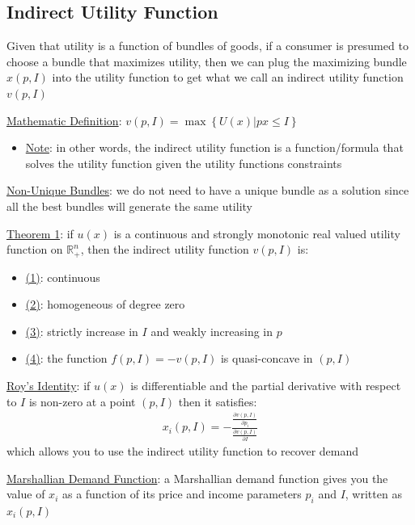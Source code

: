\documentclass{article}
\begin{document}
\subsection{Indirect Utility Function}
Given that utility is a function of bundles of goods, if a consumer is presumed to choose a bundle that maximizes utility, then we can plug the maximizing bundle $x(p,I)$ into the utility function to get what we call an indirect utility function $v(p,I)$ \par \vspace{0.3em}
  \underline{Mathematic Definition}: $v(p,I) = \max \left\{U(x) | px \leq I \right\}$
  \begin{itemize}
    \item  \underline{Note}: in other words, the indirect utility function is a function/formula that solves the utility function given the utility functions constraints
  \end{itemize}
  \par
  \underline{Non-Unique Bundles}: we do not need to have a unique bundle as a solution since all the best bundles will generate the same utility
  \par
  \underline{Theorem 1}: if $u(x)$ is a continuous and strongly monotonic real valued utility function on $\mathbb{R}_{+}^{n}$, then the indirect utility function $v(p, I)$ is:
  \begin{itemize}
    \item  \underline{(1)}: continuous
    \item  \underline{(2)}: homogeneous of degree zero
    \item  \underline{(3)}: strictly increase in $I$ and weakly increasing in $p$
    \item  \underline{(4)}: the function $f(p, I) = -v(p,I)$ is quasi-concave in $(p,I)$
  \end{itemize}
  \par
  \underline{Roy's Identity}: if $u(x)$ is differentiable and the partial derivative with respect to $I$ is non-zero at a point $(p, I)$ then it satisfies:
  \begin{gather*}
    x_{i}(p, I) = -\frac{\tfrac{\partial v(p,I)}{\partial p_{i}}}{\tfrac{\partial v(p,I)}{\partial I}}
  \end{gather*}
  which allows you to use the indirect utility function to recover demand
  \par
  \underline{Marshallian Demand Function}: a Marshallian demand function gives you the value of $x_{i}$ as a function of its price and income parameters $p_{i}$ and $I$, written as $x_{i}(p,I)$
\end{document}
